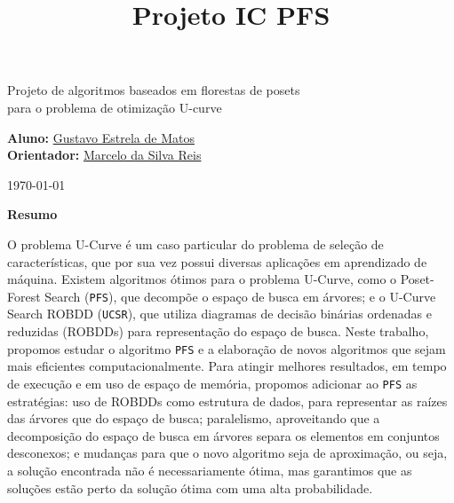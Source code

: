 \documentclass[12pt]{article}
\title{Projeto IC PFS}
\begin{document}
%
\doublespacing

\begin{center}
    {\LARGE Projeto de algoritmos baseados em florestas de posets\\
        \bigskip 
        para o problema de otimização U-curve}

    \bigskip        

    {\large {\bf Aluno:} \href{mailto:gustavo.estrela.matos@usp.br}
        {Gustavo Estrela de Matos}\\ 
    {\bf Orientador:} \href{mailto:marcelo.reis@butantan.gov.br}
        {Marcelo da Silva Reis}\\

    \bigskip

    \today\\
    }

    \bigskip
    \bigskip

    {\bf Resumo}    
\end{center}
O problema U-Curve é um caso particular do problema de seleção de 
características, que por sua vez possui diversas aplicações em 
aprendizado de máquina. Existem algoritmos ótimos para o problema 
U-Curve, como o Poset-Forest Search ({\tt PFS}), que decompõe o espaço 
de busca em árvores; e o U-Curve Search ROBDD ({\tt UCSR}), que utiliza
diagramas de decisão binárias ordenadas e reduzidas (ROBDDs) para
representação do espaço de busca. Neste trabalho, propomos estudar o
algoritmo {\tt PFS} e a elaboração de novos algoritmos que sejam mais
eficientes computacionalmente. Para atingir melhores resultados, em
tempo de execução e em uso de espaço de memória, propomos adicionar ao
{\tt PFS} as estratégias: uso de ROBDDs como estrutura de dados, para
representar as raízes das árvores que do espaço de busca; paralelismo,
aproveitando que a decomposição do espaço de busca em árvores separa os
elementos em conjuntos desconexos; e mudanças para que o novo algoritmo
seja de aproximação, ou seja, a solução encontrada não é necessariamente
ótima, mas garantimos que as soluções estão perto da solução ótima com
uma alta probabilidade.


\newpage
\end{document}
